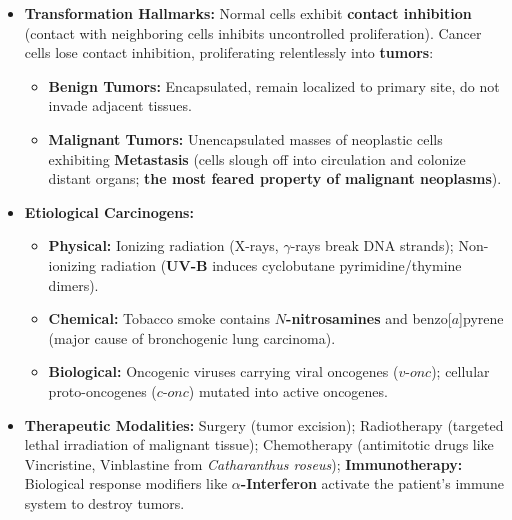 \documentclass[10pt,a4paper]{article}
\begin{document}
\begin{conceptbox}
\begin{itemize}[leftmargin=*]
  \item \textbf{Transformation Hallmarks:} Normal cells exhibit \textbf{contact inhibition} (contact with neighboring cells inhibits uncontrolled proliferation). Cancer cells lose contact inhibition, proliferating relentlessly into \textbf{tumors}:
  \begin{itemize}
    \item \textbf{Benign Tumors:} Encapsulated, remain localized to primary site, do not invade adjacent tissues.
    \item \textbf{Malignant Tumors:} Unencapsulated masses of neoplastic cells exhibiting \textbf{Metastasis} (cells slough off into circulation and colonize distant organs; \textbf{the most feared property of malignant neoplasms}).
  \end{itemize}
  \item \textbf{Etiological Carcinogens:}
  \begin{itemize}
    \item \textbf{Physical:} Ionizing radiation (X-rays, $\gamma$-rays break DNA strands); Non-ionizing radiation (\textbf{UV-B} induces cyclobutane pyrimidine/thymine dimers).
    \item \textbf{Chemical:} Tobacco smoke contains \textbf{$N$-nitrosamines} and benzo[$a$]pyrene (major cause of bronchogenic lung carcinoma).
    \item \textbf{Biological:} Oncogenic viruses carrying viral oncogenes ($v\text{-}onc$); cellular proto-oncogenes ($c\text{-}onc$) mutated into active oncogenes.
  \end{itemize}
  \item \textbf{Therapeutic Modalities:} Surgery (tumor excision); Radiotherapy (targeted lethal irradiation of malignant tissue); Chemotherapy (antimitotic drugs like Vincristine, Vinblastine from \textit{Catharanthus roseus}); \textbf{Immunotherapy:} Biological response modifiers like \textbf{$\alpha$-Interferon} activate the patient's immune system to destroy tumors.
\end{itemize}
\end{conceptbox}
\end{document}
